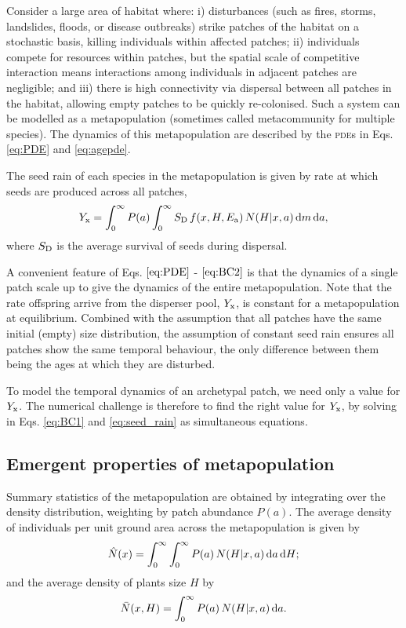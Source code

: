 \documentclass[10pt,twoside]{article}
\begin{document}
Consider a large area of habitat where: i) disturbances (such as fires,
storms, landslides, floods, or disease outbreaks) strike patches of the
habitat on a stochastic basis, killing individuals within affected
patches; ii) individuals compete for resources within patches, but the
spatial scale of competitive interaction means interactions among
individuals in adjacent patches are negligible; and iii) there is high
connectivity via dispersal between all patches in the habitat, allowing
empty patches to be quickly re-colonised. Such a system can be modelled
as a metapopulation (sometimes called metacommunity for multiple
species). The dynamics of this metapopulation are described by the
\textsc{pde}s in Eqs. \ref{eq:PDE} and  \ref{eq:agepde}.

The seed rain of each species in the metapopulation is given by rate at
which seeds are produced across all patches,
\begin{equation}  \label{eq:seed_rain}
  Y_{\rm x} = \int_0^{\infty} P(a)  \int_0^{\infty} S_{\rm D} \, f(x, H, E_{\rm a}) \, N(H | x, a) \, {\rm d} m \, {\rm d} a,
\end{equation}
where \(S_{\rm D}\) is the average survival of seeds during dispersal.

A convenient feature of Eqs. \(\ref{eq:PDE}\) - \(\ref{eq:BC2}\) is that
the dynamics of a single patch scale up to give the dynamics of the
entire metapopulation. Note that the rate offspring arrive from the
disperser pool, \(Y_{\rm x}\), is constant for a metapopulation at
equilibrium. Combined with the assumption that all patches have the same
initial (empty) size distribution, the assumption of constant seed rain
ensures all patches show the same temporal behaviour, the only
difference between them being the ages at which they are disturbed.

To model the temporal dynamics of an archetypal patch, we need only a
value for \(Y_{\rm x}\). The numerical challenge is therefore to find the
right value for \(Y_{\rm x}\), by solving in Eqs. \ref{eq:BC1} and
\ref{eq:seed_rain} as simultaneous equations.

\subsection{Emergent properties of
metapopulation}\label{emergent-properties-of-metapopulation}

Summary statistics of the metapopulation are obtained by integrating
over the density distribution, weighting by patch abundance \(P(a)\).
The average density of individuals per unit ground area across the metapopulation is given by
\begin{equation}
  \hat{N}(x) = \int_{0}^{\infty} \int_{0}^{\infty}P(a) \, N(H | x, a) \, {\rm d}a \, {\rm d}H;
\end{equation}
and the average density of plants size \(H\) by
\begin{equation}
  \bar{N}(x, H) = \int_{0}^{\infty}P(a) \, N(H | x, a) \, {\rm d}a.
\end{equation}
\end{document}
